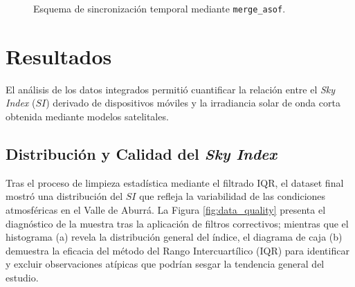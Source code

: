 \documentclass[twocolumn]{aastex701}
\begin{document}
\begin{figure}[t!]
    \centering
    \caption{Esquema de sincronización temporal mediante \texttt{merge\_asof}.}
    \label{fig:binning_logic}
\end{figure}

\section{Resultados} \label{sec:resultados}

El análisis de los datos integrados permitió cuantificar la relación entre el \textit{Sky Index} ($SI$) derivado de dispositivos móviles y la irradiancia solar de onda corta obtenida mediante modelos satelitales.

\subsection{Distribución y Calidad del \textit{Sky Index}}
Tras el proceso de limpieza estadística mediante el filtrado IQR, el dataset final mostró una distribución del $SI$ que refleja la variabilidad de las condiciones atmosféricas en el Valle de Aburrá. La Figura \ref{fig:data_quality} presenta el diagnóstico de la muestra tras la aplicación de filtros correctivos; mientras que el histograma (a) revela la distribución general del índice, el diagrama de caja (b) demuestra la eficacia del método del Rango Intercuartílico (IQR) para identificar y excluir observaciones atípicas que podrían sesgar la tendencia general del estudio.
\end{document}
